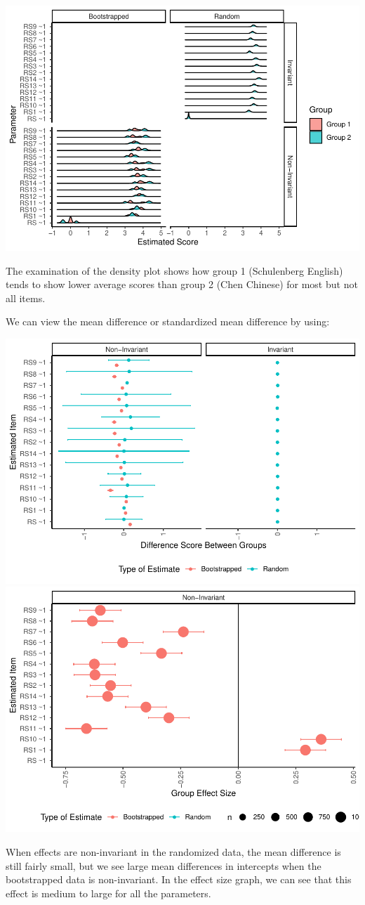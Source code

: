 \documentclass[
  man]{apa7}
\begin{document}
\includegraphics{manuscript_files/figure-latex/unnamed-chunk-114-1.pdf}

The examination of the density plot shows how group 1 (Schulenberg English) tends to show lower average scores than group 2 (Chen Chinese) for most but not all items.

We can view the mean difference or standardized mean difference by using:

\includegraphics{manuscript_files/figure-latex/unnamed-chunk-115-1.pdf} \includegraphics{manuscript_files/figure-latex/unnamed-chunk-115-2.pdf}

When effects are non-invariant in the randomized data, the mean difference is still fairly small, but we see large mean differences in intercepts when the bootstrapped data is non-invariant. In the effect size graph, we can see that this effect is medium to large for all the parameters.
\end{document}
